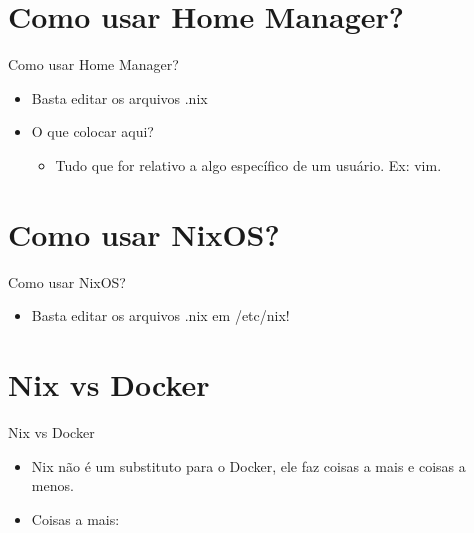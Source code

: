 \documentclass[presentation]{beamer}
\begin{document}
\section{Como usar Home Manager?}
\label{sec:orgc284d18}

\begin{frame}[label={sec:orgba80d96}]{Como usar Home Manager?}
\begin{itemize}
\item Basta editar os arquivos .nix
\item O que colocar aqui?
\begin{itemize}
\item Tudo que for relativo a algo específico de um usuário. Ex: vim.
\end{itemize}
\end{itemize}
\end{frame}

\section{Como usar NixOS?}
\label{sec:org8eda720}

\begin{frame}[label={sec:orga01a503}]{Como usar NixOS?}
\begin{itemize}
\item Basta editar os arquivos .nix em /etc/nix!
\end{itemize}
\end{frame}

\section{Nix vs Docker}
\label{sec:org5bdfd94}
\begin{frame}[label={sec:org66ef4a5}]{Nix vs Docker}
\begin{itemize}
\item Nix não é um substituto para o Docker, ele faz coisas a mais e coisas a menos.
\item Coisas a mais:
\end{itemize}
\end{frame}
\end{document}
